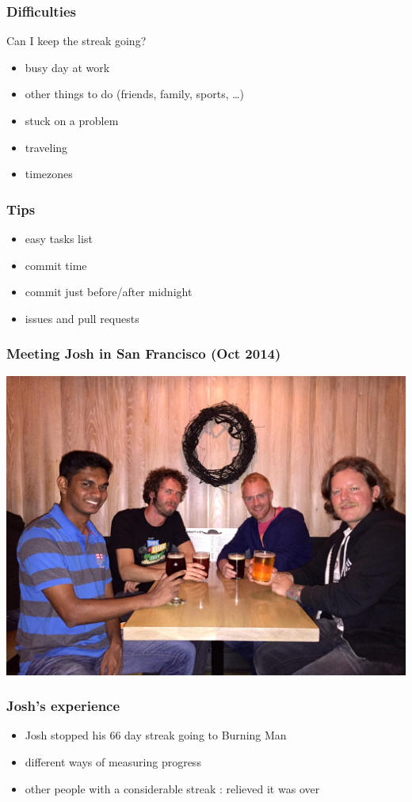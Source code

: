 \documentclass[14pt]{beamer}
\begin{document}
  \begin{frame}
    \frametitle{Difficulties}
    Can I keep the streak going?
    \begin{itemize}
      \item busy day at work
      \item other things to do (friends, family, sports, \ldots)
      \item stuck on a problem
      \item traveling
      \item timezones
    \end{itemize}
  \end{frame}
  \begin{frame}
    \frametitle{Tips}
    \begin{itemize}
      \item easy tasks list
      \item commit time
      \item commit just before/after midnight
      \item issues and pull requests
    \end{itemize}
  \end{frame}
  \begin{frame}
    \frametitle{Meeting Josh in San Francisco (Oct 2014)}
    \includegraphics[scale=.1]{josh_justin.jpg}
  \end{frame}
  \begin{frame}
    \frametitle{Josh's experience}
    \begin{itemize}
      \item Josh stopped his 66 day streak going to Burning Man
      \item different ways of measuring progress
      \item other people with a considerable streak : relieved it was over
    \end{itemize}
  \end{frame}
\end{document}

